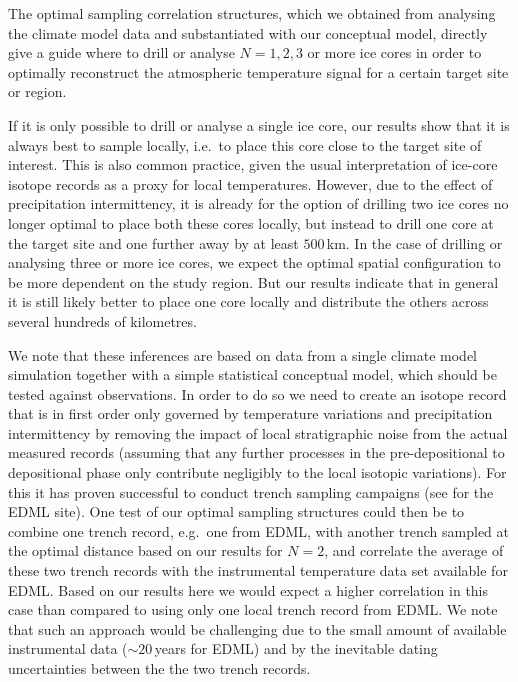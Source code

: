 \documentclass[cp, manuscript]{copernicus}
\begin{document}
The optimal sampling correlation structures, which we obtained from analysing
the climate model data and substantiated with our conceptual model, directly
give a guide where to drill or analyse $N=1, 2, 3$ or more ice cores in order to
optimally reconstruct the atmospheric temperature signal for a certain target
site or region.

If it is only possible to drill or analyse a single ice core, our results
show that it is always best to sample locally, i.e.\ to place this core
close to the target site of interest. This is also common practice, given the
usual interpretation of ice-core isotope records as a proxy for local
temperatures. However, due to the effect of precipitation intermittency, it is
already for the option of drilling two ice cores no longer optimal to place both
these cores locally, but instead to drill one core at the target site and one
further away by at least $500$\,km. In the case of drilling or analysing three
or more ice cores, we expect the optimal spatial configuration to be more
dependent on the study region. But our results indicate that in general it is
still likely better to place one core locally and distribute the others across
several hundreds of kilometres.

We note that these inferences are based on data from a single climate model
simulation together with a simple statistical conceptual model, which should be
tested against observations. In order to do so we need to create an isotope
record that is in first order only governed by temperature variations and
precipitation intermittency by removing the impact of local stratigraphic noise
from the actual measured records (assuming that any further processes in the
pre-depositional to depositional phase only contribute negligibly to the local
isotopic variations). For this it has proven successful to conduct trench
sampling campaigns (see \citealp{Munch2016,Munch2017} for the EDML site). One
test of our optimal sampling structures could then be to combine one trench
record, e.g.\ one from EDML, with another trench sampled at the optimal distance
based on our results for $N=2$, and correlate the average of these two trench
records with the instrumental temperature data set available for EDML. Based on
our results here we would expect a higher correlation in this case than compared
to using only one local trench record from EDML. We note that such an approach
would be challenging due to the small amount of available instrumental data
($\sim20$\,years for EDML) and by the inevitable dating uncertainties between
the the two trench records.
\end{document}
